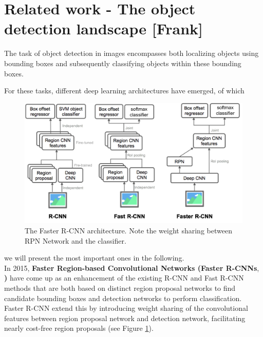 \documentclass[a4paper]{article}
\begin{document}
\section{Related work - The object detection landscape [Frank]}
The task of object detection in images encompasses both localizing objects using bounding boxes and subsequently classifying objects within these bounding boxes.

For these tasks, different deep learning architectures have emerged, of which 

\begin{figure}
\includegraphics[scale=0.18]{images/FRCN_architecture}
\caption{The Faster R-CNN architecture. Note the weight sharing between RPN Network and the classifier.}
\label{fig:rcnn-architectures}
\end{figure} we will present the most important ones in the following.\\ In 2015, \textbf{Faster Region-based Convolutional Networks (Faster R-CNNs}, \cite{DBLP:journals/corr/RenHG015}\textbf{)}  have come up as an enhancement  of the existing R-CNN and Fast R-CNN methods that are both based on distinct region proposal networks to find candidate bounding boxes and detection networks to perform classification. Faster R-CNN extend this by introducing weight sharing of the convolutional features between region proposal network and detection network, facilitating nearly cost-free region proposals (see Figure \ref{fig:rcnn-architectures}). 
\end{document}
